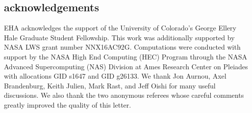 \documentclass[aps, prl, twocolumn, nofootinbib, groupedaddress, amsfonts, amssymb, amsmath]{revtex4-1}
\begin{document}
\subsection{acknowledgements}
EHA acknowledges the support of the University of Colorado's George 
Ellery Hale Graduate Student Fellowship.
This work was additionally supported by  NASA LWS grant number NNX16AC92G.  
Computations were conducted 
with support by the NASA High End Computing (HEC) Program through the NASA 
Advanced Supercomputing (NAS) Division at Ames Research Center on Pleiades
with allocations GID s1647 and GID g26133.
We thank Jon Aurnou, Axel Brandenburg, Keith Julien, Mark Rast, and Jeff Oishi 
for many useful discussions. We also thank the two anonymous referees whose
careful comments greatly improved the quality of this letter.


\end{document}
